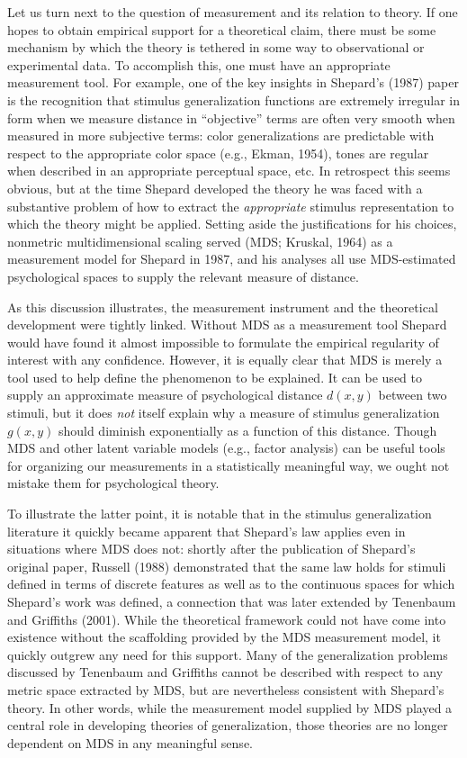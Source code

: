 \documentclass[
  english,
  doc]{apa6}
\begin{document}
\noindent
Let us turn next to the question of measurement and its relation to theory. If one hopes to obtain empirical support for a theoretical claim, there must be some mechanism by which the theory is tethered in some way to observational or experimental data. To accomplish this, one must have an appropriate measurement tool. For example, one of the key insights in Shepard's (1987) paper is the recognition that stimulus generalization functions are extremely irregular in form when we measure distance in \enquote{objective} terms are often very smooth when measured in more subjective terms: color generalizations are predictable with respect to the appropriate color space (e.g., Ekman, 1954), tones are regular when described in an appropriate perceptual space, etc. In retrospect this seems obvious, but at the time Shepard developed the theory he was faced with a substantive problem of how to extract the \emph{appropriate} stimulus representation to which the theory might be applied. Setting aside the justifications for his choices, nonmetric multidimensional scaling served (MDS; Kruskal, 1964) as a measurement model for Shepard in 1987, and his analyses all use MDS-estimated psychological spaces to supply the relevant measure of distance.

As this discussion illustrates, the measurement instrument and the theoretical development were tightly linked. Without MDS as a measurement tool Shepard would have found it almost impossible to formulate the empirical regularity of interest with any confidence. However, it is equally clear that MDS is merely a tool used to help define the phenomenon to be explained. It can be used to supply an approximate measure of psychological distance \(d(x,y)\) between two stimuli, but it does \emph{not} itself explain why a measure of stimulus generalization \(g(x,y)\) should diminish exponentially as a function of this distance. Though MDS and other latent variable models (e.g., factor analysis) can be useful tools for organizing our measurements in a statistically meaningful way, we ought not mistake them for psychological theory.

To illustrate the latter point, it is notable that in the stimulus generalization literature it quickly became apparent that Shepard's law applies even in situations where MDS does not: shortly after the publication of Shepard's original paper, Russell (1988) demonstrated that the same law holds for stimuli defined in terms of discrete features as well as to the continuous spaces for which Shepard's work was defined, a connection that was later extended by Tenenbaum and Griffiths (2001). While the theoretical framework could not have come into existence without the scaffolding provided by the MDS measurement model, it quickly outgrew any need for this support. Many of the generalization problems discussed by Tenenbaum and Griffiths cannot be described with respect to any metric space extracted by MDS, but are nevertheless consistent with Shepard's theory. In other words, while the measurement model supplied by MDS played a central role in developing theories of generalization, those theories are no longer dependent on MDS in any meaningful sense.
\end{document}
